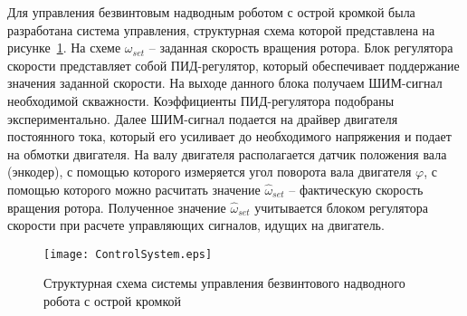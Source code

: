 
Для управления безвинтовым надводным роботом с острой кромкой была разработана система управления, структурная схема которой представлена на рисунке~\ref{ControlSystem}. На схеме $ \omega_{set} $ -- заданная скорость вращения ротора. Блок регулятора скорости представляет собой ПИД-регулятор, который обеспечивает поддержание значения заданной скорости. На выходе данного блока получаем ШИМ-сигнал необходимой скважности. Коэффициенты ПИД-регулятора подобраны экспериментально. Далее ШИМ-сигнал подается на драйвер двигателя постоянного тока, который его усиливает до необходимого напряжения и подает на обмотки двигателя. 
На валу двигателя располагается датчик положения вала (энкодер), с помощью которого измеряется угол поворота вала двигателя $ \varphi $, с помощью которого можно расчитать значение $ \hat{\omega}_{set} $ -- фактическую скорость вращения ротора. Полученное значение $ \hat{\omega}_{set} $ учитывается блоком регулятора скорости при расчете управляющих сигналов, идущих на двигатель. 

\begin{figure}[!h]
	\centering
	\texttt{[image: ControlSystem.eps]}
	\caption{Структурная схема системы управления безвинтового надводного робота с острой кромкой}
	\label{ControlSystem}
\end{figure}















